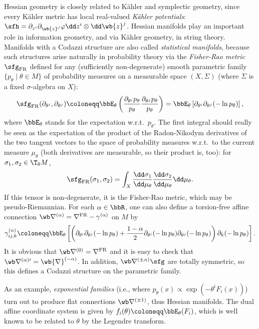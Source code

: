 \begin{example}
    Hessian geometry is closely related to K\"ahler and symplectic geometry, since every K\"ahler metric has local real-valued \emph{K\"ahler potentials}: $\sfh=\partial_{z^i}\partial_{\wb{z}^j}\varphi \dd z^i\otimes\dd\wb{z}^j$. Hessian manifolds play an important role in information geometry, and via K\"ahler geometry, in string theory. Manifolds with a Codazzi structure are also called \emph{statistical manifolds}, because such structures arise naturally in probability theory via the \emph{Fisher-Rao metric} $\sfg_{\mathrm{FR}}$ defined for any (sufficiently non-degenerate) smooth parametric family $\{p_\theta\mid \theta\in M\}$ of probability measures on a measurable space $(X,\varSigma)$ (where $\varSigma$ is a fixed $\sigma$-algebra on $X$):
    \[\sfg_{\mathrm{FR}}(\partial_{\theta^i},\partial_{\theta^j})\coloneqq \bbE_\theta\left(\frac{\partial_{\theta^i} p_\theta}{p_\theta} \frac{\partial_{\theta^j} p_\theta}{p_\theta}\right)=\bbE_\theta\left[\partial_{\theta^i} \partial_{\theta^j}(-\ln p_\theta)\right],\]
    where $\bbE_\theta$ stands for the expectation w.r.t.\ $p_\theta$. The first integral should really be seen as the expectation of the product of the Radon-Nikodym derivatives of the two tangent vectors to the space of probability measures w.r.t.\ to the current measure $\mu_\theta$ (both derivatives are measurable, so their product is, too): for $\sigma_1,\sigma_2\in \T_\theta M$, 
    \[\sfg_{\mathrm{FR}}(\sigma_1,\sigma_2)=\int_X \frac{\dd \sigma_1}{\dd \mu_\theta}\frac{\dd \sigma_2}{\dd \mu_\theta}\dd \mu_\theta.\] 
    If this tensor is non-degenerate, it is the Fisher-Rao metric, which may be pseudo-Riemannian. For each $\alpha\in\bbR$, one can also define a torsion-free affine connection $\wb\nabla^{(\alpha)}=\nabla^{\mathrm{FR}}-\gamma^{(\alpha)}$ on $M$ by
    \[\gamma_{ij,k}^{(\alpha)}\coloneqq \bbE_\theta \left[\left(\partial_{\theta^i}\partial_{\theta^j}(-\ln p_\theta)+\frac{1-\alpha}{2}\partial_{\theta^i}(-\ln p_\theta)\partial_{\theta^j}(-\ln p_\theta)\right)\partial_k(-\ln p_\theta)\right].\]
    It is obvious that $\wb\nabla^{(0)}=\nabla^{\mathrm{FR}}$ and it is easy to check that $\wb\nabla^{(\alpha)\prime}=\wb{\nabla}^{(-\alpha)}$. In addition, $\wb\nabla^{(\pm\alpha)}\sfg$ are totally symmetric, so this defines a Codazzi structure on the parametric family. 
    
    As an example, \emph{exponential families} (i.e., where $p_\theta(x)\propto \exp(-\theta^iF_i(x))$) turn out to produce flat connections $\wb\nabla^{(\pm 1)}$, thus Hessian manifolds. The dual affine coordinate system is given by $f_i(\theta)\coloneqq \bbE_\theta(F_i)$, which is well known to be related to $\theta$ by the Legendre transform.
\end{example}





